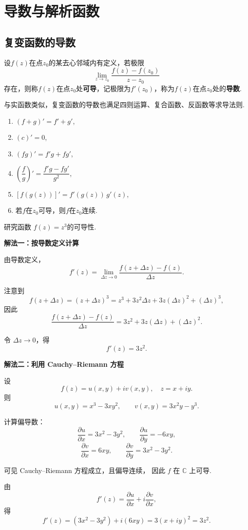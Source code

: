 \documentclass[openany,oneside]{ctexbook}
\begin{document}
\section{导数与解析函数}
\subsection{复变函数的导数}
\begin{theorem}
设$f(z)$在点$z_0$的某去心邻域内有定义，若极限
\[
    \lim_{z \to z_0} \frac{f(z) - f(z_0)}{z - z_0}
\]
存在，则称$f(z)$在点$z_0$处\textbf{可导}，记极限为$f'(z_0)$，称为$f(z)$在点$z_0$处的\textbf{导数}.
\end{theorem}
与实函数类似，复变函数的导数也满足四则运算、复合函数、反函数等求导法则.
\begin{enumerate}\setlength{\itemsep}{0.5pt}
  \item $(f+g)' = f' + g'$,
  \item $(c)' = 0$,
  \item $(fg)' = f'g + fg'$,
  \item $\left(\dfrac{f}{g}\right)' = \dfrac{f'g - fg'}{g^2}$,
  \item $[f(g(z))]' = f'(g(z))\,g'(z)$,
  \item 若$f$在$z_0$可导，则$f$在$z_0$连续.
\end{enumerate}
\begin{example}
研究函数
$
f(z)=z^3
$的可导性.
\end{example}

\begin{solution}
\par
\textbf{解法一：按导数定义计算}

由导数定义，
\[
f'(z)
=
\lim_{\Delta z\to 0}
\frac{f(z+\Delta z)-f(z)}{\Delta z}.
\]

注意到
\[
f(z+\Delta z)=(z+\Delta z)^3
= z^3+3z^2\Delta z+3z(\Delta z)^2+(\Delta z)^3,
\]
因此
\[
\frac{f(z+\Delta z)-f(z)}{\Delta z}
=
3z^2+3z(\Delta z)+(\Delta z)^2.
\]

令 $\Delta z\to 0$，得
\[
f'(z)=3z^2.
\]

\textbf{解法二：利用 Cauchy--Riemann 方程}

设
\[
f(z)=u(x,y)+iv(x,y),
\quad z=x+iy.
\]
则
\[
u(x,y)=x^3-3xy^2,
\qquad
v(x,y)=3x^2y-y^3.
\]

计算偏导数：
\[
\frac{\partial u}{\partial x}=3x^2-3y^2,
\qquad
\frac{\partial u}{\partial y}=-6xy,
\]
\[
\frac{\partial v}{\partial x}=6xy,
\qquad
\frac{\partial v}{\partial y}=3x^2-3y^2.
\]

可见 Cauchy--Riemann 方程成立，且偏导连续，
因此 $f$ 在 $\mathbb{C}$ 上可导.

由
\[
f'(z)
=
\frac{\partial u}{\partial x}
+
i\frac{\partial v}{\partial x},
\]
得
\[
f'(z)
=
(3x^2-3y^2)+i(6xy)
=
3(x+iy)^2
=
3z^2.
\]
\end{solution}
\end{document}

